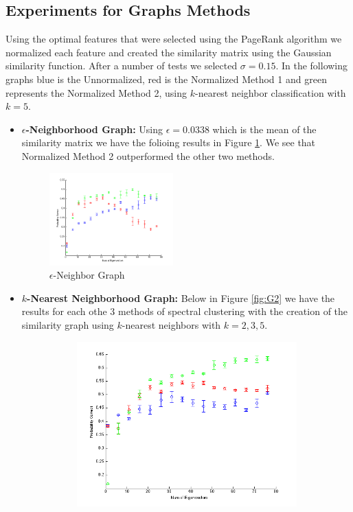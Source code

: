 \documentclass[12pt]{article}
\begin{document}
\subsection{Experiments for Graphs Methods} 
Using the optimal features that were selected using the PageRank algorithm we normalized each feature and created the similarity matrix using the Gaussian similarity function. After a number of tests we selected $\sigma = 0.15$. In the following graphs {\color{blue} blue} is the Unnormalized, {\color{red} red} is the Normalized Method 1 and {\color{green} green} represents the Normalized Method 2, using $k$-nearest neighbor classification with $k =5$. 
\begin{itemize}
\item{\bf{$\epsilon$-Neighborhood Graph:}} Using $\epsilon = 0.0338$ which is the mean of the similarity matrix we have the folioing results in Figure \ref{fig:G1}. We see that Normalized Method 2 outperformed the other two methods. 
\begin{figure}[h!]
   \centering
   \includegraphics[width=0.45\textwidth]{figures/G1_epsmean.png}
   \caption{$\epsilon$-Neighbor Graph}
   \label{fig:G1}
\end{figure}
\vspace{55mm}
\item{\bf{$k$-Nearest Neighborhood Graph:}} Below in Figure \ref{fig:G2} we have the results for each othe 3 methods of spectral clustering with the creation of the similarity graph using $k$-nearest neighbors with $k =2,3,5$. 
\begin{figure}[h!]
    \centering
        \begin{subfigure}[b]{0.45\textwidth}
                \includegraphics[width=\textwidth]{figures/G2_k_2.png}

\end{subfigure}
\end{figure}
\end{itemize}
\end{document}
